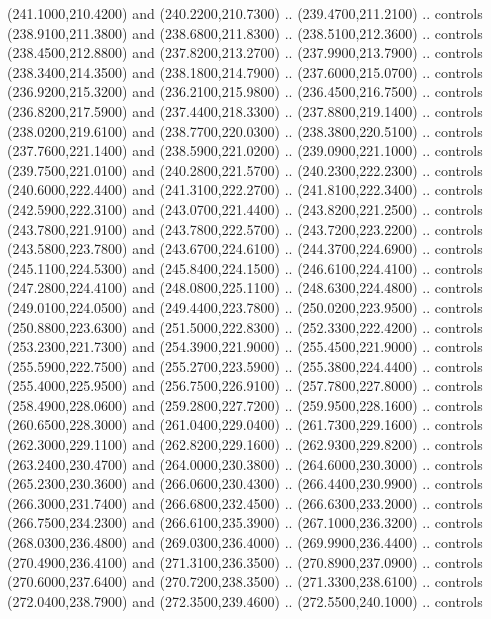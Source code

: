 {\begin{scope}[y=0.80pt, x=0.80pt, yscale=-1, xscale=1, inner sep=0pt, outer sep=0pt, #1]
      (241.1000,210.4200) and (240.2200,210.7300) .. (239.4700,211.2100) .. controls
      (238.9100,211.3800) and (238.6800,211.8300) .. (238.5100,212.3600) .. controls
      (238.4500,212.8800) and (237.8200,213.2700) .. (237.9900,213.7900) .. controls
      (238.3400,214.3500) and (238.1800,214.7900) .. (237.6000,215.0700) .. controls
      (236.9200,215.3200) and (236.2100,215.9800) .. (236.4500,216.7500) .. controls
      (236.8200,217.5900) and (237.4400,218.3300) .. (237.8800,219.1400) .. controls
      (238.0200,219.6100) and (238.7700,220.0300) .. (238.3800,220.5100) .. controls
      (237.7600,221.1400) and (238.5900,221.0200) .. (239.0900,221.1000) .. controls
      (239.7500,221.0100) and (240.2800,221.5700) .. (240.2300,222.2300) .. controls
      (240.6000,222.4400) and (241.3100,222.2700) .. (241.8100,222.3400) .. controls
      (242.5900,222.3100) and (243.0700,221.4400) .. (243.8200,221.2500) .. controls
      (243.7800,221.9100) and (243.7800,222.5700) .. (243.7200,223.2200) .. controls
      (243.5800,223.7800) and (243.6700,224.6100) .. (244.3700,224.6900) .. controls
      (245.1100,224.5300) and (245.8400,224.1500) .. (246.6100,224.4100) .. controls
      (247.2800,224.4100) and (248.0800,225.1100) .. (248.6300,224.4800) .. controls
      (249.0100,224.0500) and (249.4400,223.7800) .. (250.0200,223.9500) .. controls
      (250.8800,223.6300) and (251.5000,222.8300) .. (252.3300,222.4200) .. controls
      (253.2300,221.7300) and (254.3900,221.9000) .. (255.4500,221.9000) .. controls
      (255.5900,222.7500) and (255.2700,223.5900) .. (255.3800,224.4400) .. controls
      (255.4000,225.9500) and (256.7500,226.9100) .. (257.7800,227.8000) .. controls
      (258.4900,228.0600) and (259.2800,227.7200) .. (259.9500,228.1600) .. controls
      (260.6500,228.3000) and (261.0400,229.0400) .. (261.7300,229.1600) .. controls
      (262.3000,229.1100) and (262.8200,229.1600) .. (262.9300,229.8200) .. controls
      (263.2400,230.4700) and (264.0000,230.3800) .. (264.6000,230.3000) .. controls
      (265.2300,230.3600) and (266.0600,230.4300) .. (266.4400,230.9900) .. controls
      (266.3000,231.7400) and (266.6800,232.4500) .. (266.6300,233.2000) .. controls
      (266.7500,234.2300) and (266.6100,235.3900) .. (267.1000,236.3200) .. controls
      (268.0300,236.4800) and (269.0300,236.4000) .. (269.9900,236.4400) .. controls
      (270.4900,236.4100) and (271.3100,236.3500) .. (270.8900,237.0900) .. controls
      (270.6000,237.6400) and (270.7200,238.3500) .. (271.3300,238.6100) .. controls
      (272.0400,238.7900) and (272.3500,239.4600) .. (272.5500,240.1000) .. controls

\end{scope}}
